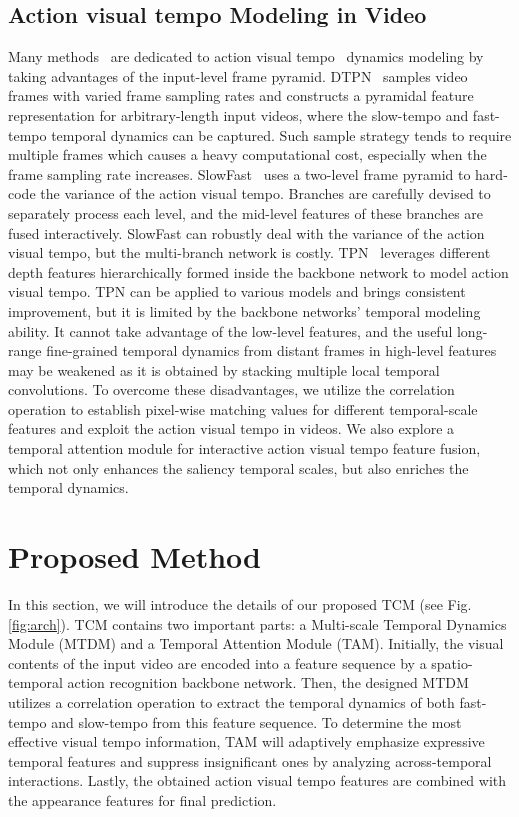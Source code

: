\documentclass[journal]{IEEEtran}
\begin{document}
\subsection{Action visual tempo Modeling in Video}
Many methods~\cite{yang2020temporal,zhang2018dynamic,feichtenhofer2019slowfast} are dedicated to action visual tempo~\cite{wang2008visual} dynamics modeling by taking advantages of the input-level frame pyramid. DTPN~\cite{zhang2018dynamic} samples video frames with varied frame sampling rates and constructs a pyramidal feature representation for arbitrary-length input videos, where the slow-tempo and fast-tempo temporal dynamics can be captured. Such sample strategy tends to require multiple frames which causes a heavy computational cost, especially when the frame sampling rate increases. SlowFast~\cite{feichtenhofer2019slowfast} uses a two-level frame pyramid to hard-code the variance of the action visual tempo.
Branches are carefully devised to separately process each level, and the mid-level features of these branches are fused interactively. SlowFast can robustly deal with the variance of the action visual tempo, but the multi-branch network is costly. TPN~\cite{yang2020temporal} leverages different depth features hierarchically formed inside the backbone network to model action visual tempo. TPN can be applied to various models and brings consistent improvement, but it is limited by the backbone networks' temporal modeling ability. It cannot take advantage of the low-level features, and the useful long-range fine-grained temporal dynamics from distant frames in high-level features may be weakened as it is obtained by stacking multiple local temporal convolutions. To overcome these disadvantages, we utilize the correlation operation to establish pixel-wise matching values for different temporal-scale features and exploit the action visual tempo in videos. We also explore a temporal attention module for interactive action visual tempo feature fusion, which not only enhances the saliency temporal scales, but also enriches the temporal dynamics.


\section{Proposed Method}
In this section, we will introduce the details of our proposed TCM (see Fig. \ref{fig:arch}). TCM contains two important parts: a Multi-scale Temporal Dynamics Module (MTDM) and a Temporal Attention Module (TAM). Initially, the visual contents of the input video are encoded into a feature sequence by a spatio-temporal action recognition backbone network. Then, the designed MTDM utilizes a correlation operation to extract the temporal dynamics of both fast-tempo and slow-tempo from this feature sequence. To determine the most effective visual tempo information, TAM will adaptively emphasize expressive temporal features and suppress insignificant ones by analyzing across-temporal interactions. Lastly, the obtained action visual tempo features are combined with the appearance features for final prediction.
\end{document}
